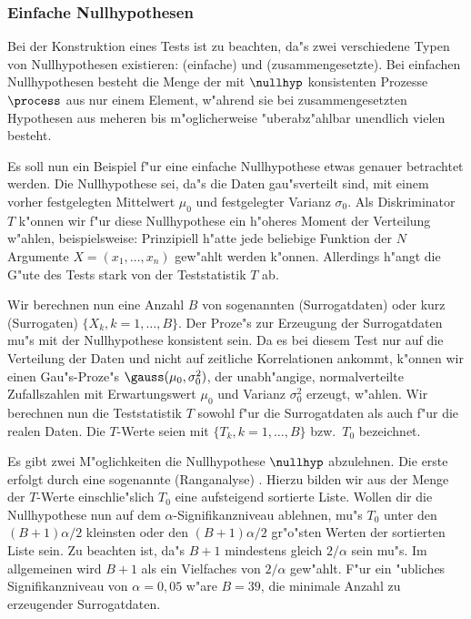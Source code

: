 \subsubsection{Einfache Nullhypothesen}
Bei der Konstruktion eines Tests ist zu beachten, da"s zwei verschiedene Typen von
Nullhypothesen existieren: \begriff(einfache) und \begriff(zusammengesetzte). Bei
einfachen Nullhypothesen besteht die Menge der mit $\nullhyp$ konsistenten Prozesse
$\process$ aus nur einem Element, w"ahrend sie bei zusammengesetzten Hypothesen aus
meheren bis m"oglicherweise "uberabz"ahlbar unendlich vielen besteht.

Es soll nun ein Beispiel f"ur eine einfache Nullhypothese etwas genauer betrachtet werden.
Die Nullhypothese sei, da"s die Daten gau"sverteilt sind, mit einem vorher festgelegten
Mittelwert $\mu_0$ und festgelegter Varianz $\sigma_0$. Als Diskriminator $T$
k"onnen wir f"ur diese Nullhypothese ein h"oheres Moment der Verteilung w"ahlen, beispielsweise:
Prinzipiell h"atte jede beliebige Funktion der $N$ Argumente $X=(x_1,\dots,x_n) $ gew"ahlt
werden k"onnen. Allerdings h"angt die G"ute des Tests stark von der Teststatistik $T$
ab\footnotemark.  


Wir berechnen nun eine Anzahl $B$ von sogenannten \begriff(Surrogatdaten) oder kurz
\begriff(Surrogaten) $\{X_k, k=1,\dots,B\}$. Der Proze"s zur Erzeugung der Surrogatdaten
mu"s mit der Nullhypothese konsistent sein. Da es bei diesem Test nur auf die Verteilung
der Daten und nicht auf zeitliche Korrelationen ankommt, k"onnen wir einen Gau"s-Proze"s
$\gauss(\mu_0,\sigma_0^2)$, der unabh"angige, normalverteilte Zufallszahlen mit
Erwartungswert $\mu_0$ und Varianz $\sigma_0^2$ erzeugt, w"ahlen. Wir berechnen nun die
Teststatistik $T$ sowohl f"ur die Surrogatdaten als auch f"ur die realen Daten. Die
$T$-Werte seien mit $\{T_k,k=1,\dots,B\}$ bzw.\ $T_0$ bezeichnet.

Es gibt zwei M"oglichkeiten die Nullhypothese $\nullhyp$ abzulehnen. Die erste erfolgt
durch eine sogenannte \begriff(Ranganalyse) \cite{Prichard-theiler3}.  Hierzu bilden wir
aus der Menge der $T$-Werte einschlie"slich $T_0$ eine aufsteigend sortierte Liste.
Wollen dir die Nullhypothese nun auf dem $\alpha$-Signifikanzniveau ablehnen, mu"s $T_0$
unter den $(B+1)\alpha/2$ kleinsten oder den $(B+1)\alpha/2$ gr"o"sten Werten der
sortierten Liste sein. Zu beachten ist, da"s $B+1$ mindestens gleich $2/\alpha$ sein mu"s.
Im allgemeinen wird $B+1$ als ein Vielfaches von $2/\alpha$ gew"ahlt. F"ur ein "ubliches
Signifikanzniveau von $\alpha=0,05$ w"are $B=39$, die minimale Anzahl zu erzeugender 
Surrogatdaten.

